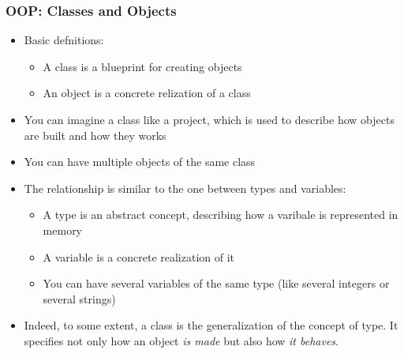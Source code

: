 \documentclass[9pt]{beamer}
\begin{document}
\begin{frame}
  \frametitle{OOP: Classes and Objects}
  
  \begin{itemize}
  \item Basic defnitions:
    \begin{itemize}
    \item A \alert{class} is a blueprint for creating objects
    \item An \alert{object} is a concrete relization of a class
    \end{itemize}

  \smallskip
  
  \item You can imagine a class like a project, which is used to
        describe how objects are built and how they works

  \smallskip

  \item You can have multiple objects of the same class
  
  \smallskip
  
  \item The relationship is similar to the one between types and variables:
    \begin{itemize} 
    \item A type is an abstract concept, describing how a varibale is
          represented in memory
    \item A variable is a concrete realization of it
    \item You can have several variables of the same type (like several integers
          or several strings)
    \end{itemize}
  
  \smallskip
  
  \item Indeed, to some extent, a class is the generalization of the concept of
        type. It specifies not only how an object \emph{is made} but also how \emph{it behaves}.
  \end{itemize}

\end{frame}
\end{document}
